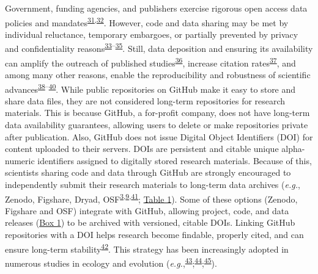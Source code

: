Government, funding agencies, and publishers exercise rigorous open access data policies and mandates\textsuperscript{\protect\hyperlink{ref-PLmDFZrm}{31},\protect\hyperlink{ref-1Hcf13Q0k}{32}}.
However, code and data sharing may be met by individual reluctance, temporary embargoes, or partially prevented by privacy and confidentiality reasons\textsuperscript{\protect\hyperlink{ref-1Ch6LSHef}{33}--\protect\hyperlink{ref-1CzUZwyU2}{35}}.
Still, data deposition and ensuring its availability can amplify the outreach of published studies\textsuperscript{\protect\hyperlink{ref-666HppfO}{36}}, increase citation rates\textsuperscript{\protect\hyperlink{ref-1CcAUn3Lu}{37}}, and among many other reasons, enable the reproducibility and robustness of scientific advances\textsuperscript{\protect\hyperlink{ref-4LaijDIZ}{38}--\protect\hyperlink{ref-1HZdsK5Kn}{40}}.
While public repositories on GitHub make it easy to store and share data files, they are not considered long-term repositories for research materials.
This is because GitHub, a for-profit company, does not have long-term data availability guarantees, allowing users to delete or make repositories private after publication.
Also, GitHub does not issue Digital Object Identifiers (DOI) for content uploaded to their servers.
DOIs are persistent and citable unique alpha-numeric identifiers assigned to digitally stored research materials.
Because of this, scientists sharing code and data through GitHub are strongly encouraged to independently submit their research materials to long-term data archives (\emph{e.g.}, Zenodo, Figshare, Dryad, OSF\textsuperscript{\protect\hyperlink{ref-10ghgV3S8}{3},\protect\hyperlink{ref-kEX5dgzK}{9},\protect\hyperlink{ref-1Du6fzB8g}{41}}; \protect\hyperlink{tbl:compare}{Table 1}).
Some of these options (Zenodo, Figshare and OSF) integrate with GitHub, allowing project, code, and data releases (\protect\hyperlink{definitions}{Box 1}) to be archived with versioned, citable DOIs.
Linking GitHub repositories with a DOI helps research become findable, properly cited, and can ensure long-term stability\textsuperscript{\protect\hyperlink{ref-iIEKCTLU}{42}}.
This strategy has been increasingly adopted in numerous studies in ecology and evolution (\emph{e.g.},\textsuperscript{\protect\hyperlink{ref-GQj3c17f}{43}};\textsuperscript{\protect\hyperlink{ref-bZNn2hbh}{44}};\textsuperscript{\protect\hyperlink{ref-ZI1OqZNr}{45}}).


